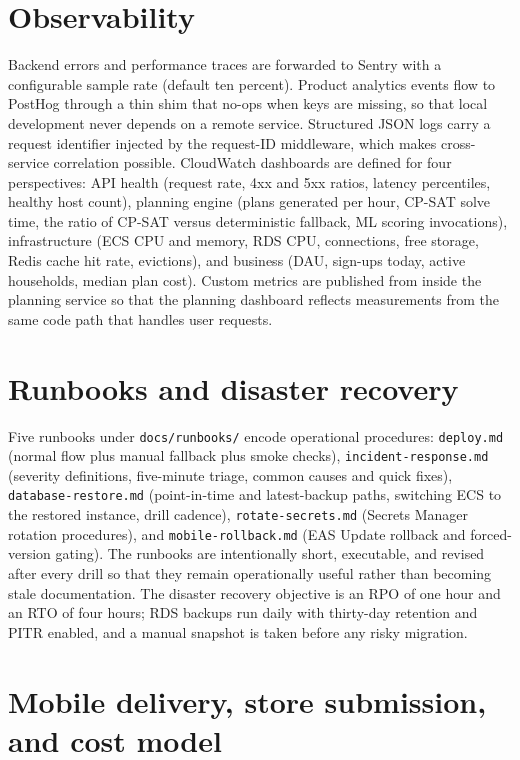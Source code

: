 \section{Observability}

Backend errors and performance traces are forwarded to Sentry with a configurable sample rate (default ten percent). Product analytics events flow to PostHog through a thin shim that no-ops when keys are missing, so that local development never depends on a remote service. Structured JSON logs carry a request identifier injected by the request-ID middleware, which makes cross-service correlation possible. CloudWatch dashboards are defined for four perspectives: API health (request rate, 4xx and 5xx ratios, latency percentiles, healthy host count), planning engine (plans generated per hour, CP-SAT solve time, the ratio of CP-SAT versus deterministic fallback, ML scoring invocations), infrastructure (ECS CPU and memory, RDS CPU, connections, free storage, Redis cache hit rate, evictions), and business (DAU, sign-ups today, active households, median plan cost). Custom metrics are published from inside the planning service so that the planning dashboard reflects measurements from the same code path that handles user requests.

\section{Runbooks and disaster recovery}

Five runbooks under \texttt{docs/runbooks/} encode operational procedures: \texttt{deploy.md} (normal flow plus manual fallback plus smoke checks), \texttt{incident-response.md} (severity definitions, five-minute triage, common causes and quick fixes), \texttt{database-restore.md} (point-in-time and latest-backup paths, switching ECS to the restored instance, drill cadence), \texttt{rotate-secrets.md} (Secrets Manager rotation procedures), and \texttt{mobile-rollback.md} (EAS Update rollback and forced-version gating). The runbooks are intentionally short, executable, and revised after every drill so that they remain operationally useful rather than becoming stale documentation. The disaster recovery objective is an RPO of one hour and an RTO of four hours; RDS backups run daily with thirty-day retention and PITR enabled, and a manual snapshot is taken before any risky migration.

\section{Mobile delivery, store submission, and cost model}


